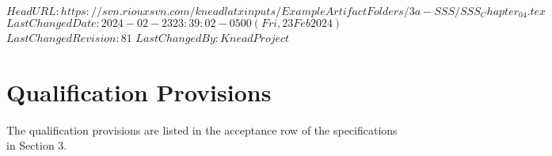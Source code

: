 \svnidlong
{$HeadURL: https://svn.riouxsvn.com/kneadlatxinputs/ExampleArtifactFolders/3a-SSS/SSS_Chapter_04.tex $}
{$LastChangedDate: 2024-02-23 23:39:02 -0500 (Fri, 23 Feb 2024) $}
{$LastChangedRevision: 81 $}
{$LastChangedBy: KneadProject $}

\chapter{Qualification Provisions}

The qualification provisions are listed in the acceptance row of the specifications in Section 3.

